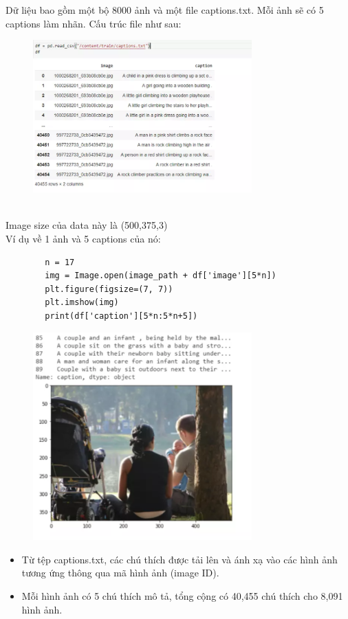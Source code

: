 \documentclass{article}
\begin{document}
Dữ liệu bao gồm một bộ 8000 ảnh và một file captions.txt. Mỗi ảnh sẽ có 5 captions làm nhãn. Cấu trúc file như sau:
\begin{figure}[h]
  \centering
  \includegraphics[width=0.75\textwidth]{img/anh2.png}
  \label{fig:my_label}
\end{figure}\\
Image size của data này là (500,375,3)\\

Ví dụ về 1 ảnh và 5 captions của nó:\\
\begin{verbatim}
        n = 17
        img = Image.open(image_path + df['image'][5*n])
        plt.figure(figsize=(7, 7))
        plt.imshow(img)
        print(df['caption'][5*n:5*n+5])
\end{verbatim}
\begin{figure}[h]
  \centering
  \includegraphics[width=0.75\textwidth]{img/anh3.png}
  \label{fig:my_label}
\end{figure}
\begin{itemize}
    \item Từ tệp captions.txt, các chú thích được tải lên và ánh xạ vào các hình ảnh tương ứng thông qua mã hình ảnh (image ID).
    \item Mỗi hình ảnh có 5 chú thích mô tả, tổng cộng có 40,455 chú thích cho 8,091 hình ảnh.
\end{itemize}
\end{document}
